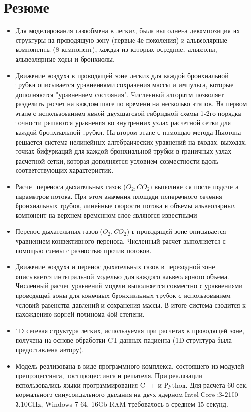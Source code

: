 \section{Резюме}
\begin{itemize}
\item
Для моделирования газообмена в легких, была выполнена декомпозиция их
структуры на проводящую зону (первые 4е поколения) и альвеолярные компоненты (8 компонент), каждая из которых осредняет альвеолы, альвеолярные ходы и бронхиолы.
\item
Движение воздуха в проводящей зоне легких  для каждой бронхиальной трубки описывается уравнениями сохранения массы и импульса, которые дополняются "уравнением состояния". Численный алгоритм позволяет разделить расчет на каждом шаге по времени на несколько этапов. На первом этапе с использованием явной двухшаговой гибридной схемы 1-2го порядка точности решаются уравнения во внутренних узлах расчетной сетки для каждой бронхиальной трубки. На втором этапе с помощью метода Ньютона решается система нелинейных алгебраических уравнений на входах, выходах, точках бифуркаций для каждой бронхиальной трубки в граничных узлах расчетной сетки, которая дополняется условием совместности вдоль соответствующих характеристик.
\item
Расчет переноса дыхательных газов ($O_{2}, CO_{2}$) выполняется после подсчета параметров потока. При этом значения площади поперечного сечения бронхиальных трубок, линейные скорости потока и объемы альвеолярных компонент на верхнем временном слое являются известными
\item
Перенос дыхательных газов ($O_{2}, CO_{2}$) в проводящей зоне описывается уравнением конвективного переноса. Численный расчет выполняется с помощью схемы с разностью против потоков. 
\item
Движение воздуха и перенос дыхательных газов в переходной зоне описывается интегральной моделью для каждого альвеолярного объема. Численный расчет уравнений модели выполняется совместно с уравнениями проводящей зоны для конечных бронхиальных трубок с использованием условий равенства давлений и сохранения массы. В итоге система сводится к нахождению корней полинома 4ой степени.  
\item 
1D сетевая структура легких, используемая при расчетах в проводящей зоне, получена на основе обработки CT-данных пациента (1D структура была предоставлена автору).
\item
Модель реализована в виде программного комплекса, состоящего из модулей препроцессинга, постпроцессинга и решателя. При реализации использовались языки программирования C++ и Python.  Для расчета 60 сек. нормального синусоидального дыхания на двух ядерном Intel Core i3-2100 3.10GHz, Windows 7-64, 16Gb RAM требовалось в среднем 15 секунд.
\end{itemize}